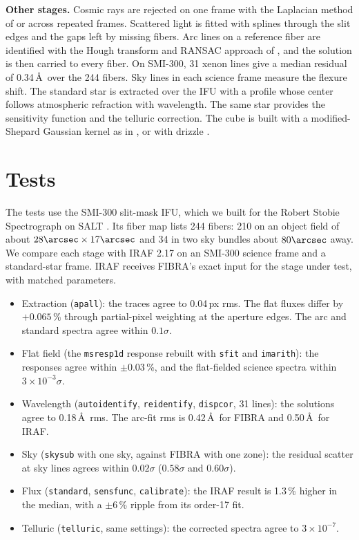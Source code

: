 \documentclass[11pt,twoside]{article}
\begin{document}
\textbf{Other stages.} Cosmic rays are rejected on one frame with the Laplacian method of \citet{2001PASP..113.1420V} or across repeated frames. Scattered light is fitted with splines through the slit edges and the gaps left by missing fibers. Arc lines on a reference fiber are identified with the Hough transform and RANSAC approach of \citet{2019arXiv191205883V}, and the solution is then carried to every fiber. On SMI-300, 31 xenon lines give a median residual of 0.34\,\AA\ over the 244 fibers. Sky lines in each science frame measure the flexure shift. The standard star is extracted over the IFU with a \citet{1969A&A.....3..455M} profile whose center follows atmospheric refraction with wavelength. The same star provides the sensitivity function and the telluric correction. The cube is built with a modified-Shepard Gaussian kernel as in \citet{2016AJ....152...83L}, or with drizzle \citep{2002PASP..114..144F}.

\section{Tests}

The tests use the SMI-300 slit-mask IFU, which we built for the Robert Stobie Spectrograph \citep[RSS;][]{2003SPIE.4841.1463B} on SALT \citep{2024SPIE13096E..2RC, 2026arXiv260322698C}. Its fiber map lists 244 fibers: 210 on an object field of about $28\arcsec \times 17\arcsec$ and 34 in two sky bundles about $80\arcsec$ away. We compare each stage with IRAF 2.17 \citep{1993ASPC...52..173T} on an SMI-300 science frame and a standard-star frame. IRAF receives FIBRA's exact input for the stage under test, with matched parameters.

\begin{itemize}
\item Extraction (\texttt{apall}): the traces agree to 0.04\,px rms. The flat fluxes differ by $+0.065$\,\% through partial-pixel weighting at the aperture edges. The arc and standard spectra agree within $0.1\sigma$.
\item Flat field (the \texttt{msresp1d} response rebuilt with \texttt{sfit} and \texttt{imarith}): the responses agree within $\pm 0.03$\,\%, and the flat-fielded science spectra within $3\times10^{-3}\sigma$.
\item Wavelength (\texttt{autoidentify}, \texttt{reidentify}, \texttt{dispcor}, 31 lines): the solutions agree to 0.18\,\AA\ rms. The arc-fit rms is 0.42\,\AA\ for FIBRA and 0.50\,\AA\ for IRAF.
\item Sky (\texttt{skysub} with one sky, against FIBRA with one zone): the residual scatter at sky lines agrees within $0.02\sigma$ ($0.58\sigma$ and $0.60\sigma$).
\item Flux (\texttt{standard}, \texttt{sensfunc}, \texttt{calibrate}): the IRAF result is 1.3\,\% higher in the median, with a $\pm 6$\,\% ripple from its order-17 fit.
\item Telluric (\texttt{telluric}, same settings): the corrected spectra agree to $3\times10^{-7}$.
\end{itemize}
\end{document}
